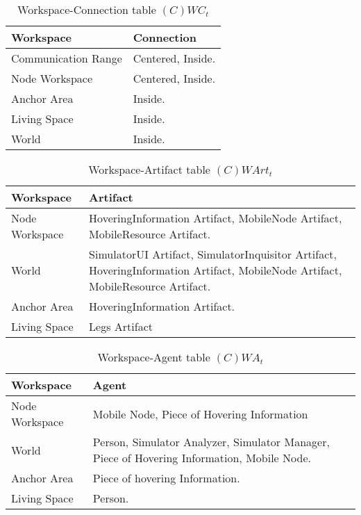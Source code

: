 \begin{table}[H]
	\centering
	\begin{tabular}{|p{4cm}|p{8cm}|}
			\hline
			\textbf{Workspace} & \textbf{Connection} \\
			\hline
			Communication Range & Centered, Inside. \\
			\hline
			Node Workspace & Centered, Inside. \\
			\hline
			Anchor Area & Inside. \\
			\hline
			Living Space & Inside. \\
			\hline
			World  & Inside. \\
			\hline
		\end{tabular}
	\caption{Workspace-Connection table $(C)WC_t$}
	\label{tab:cwct}
\end{table}

\begin{table}[H]
	\centering
	\begin{tabular}{|p{4cm}|p{8cm}|}
			\hline
			\textbf{Workspace} & \textbf{Artifact} \\
			\hline
			Node Workspace & HoveringInformation Artifact, MobileNode Artifact,
			MobileResource Artifact. \\
			\hline
			World & SimulatorUI Artifact, SimulatorInquisitor Artifact,
			HoveringInformation Artifact, MobileNode Artifact, MobileResource
			Artifact. \\
			\hline
			Anchor Area & HoveringInformation Artifact. \\
			\hline
			Living Space & Legs Artifact \\
			\hline
		\end{tabular}
	\caption{Workspace-Artifact table $(C)WArt_t$}
	\label{tab:cwartt}
\end{table}

\begin{table}[H]
	\centering
	\begin{tabular}{|p{4cm}|p{8cm}|}
			\hline
			\textbf{Workspace} & \textbf{Agent} \\
			\hline
			Node Workspace & Mobile Node, Piece of Hovering Information \\
			\hline
			World & Person, Simulator Analyzer, Simulator Manager, Piece of Hovering
			Information, Mobile Node. \\
			\hline
			Anchor Area & Piece of hovering Information. \\
			\hline
			Living Space & Person. \\
			\hline
		\end{tabular}
	\caption{Workspace-Agent table $(C)WA_t$}
	\label{tab:cwat}
\end{table}
